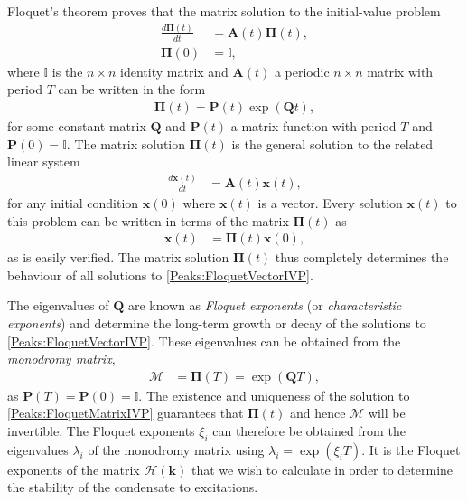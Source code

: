 Floquet's theorem proves that the matrix solution to the initial-value problem
\begin{subequations}
    \label{Peaks:FloquetMatrixIVP}
    \begin{align}
        \frac{d\bm{\Pi}(t)}{dt} &= \bm{A}(t) \bm{\Pi}(t),\\
        \bm{\Pi}(0) &= \mathbb{I},
    \end{align}
\end{subequations}
where $\mathbb{I}$ is the $n \times n$ identity matrix and $\bm{A}(t)$ a periodic $n \times n$ matrix with period $T$ can be written in the form
\begin{align}
    \bm{\Pi}(t) = \bm{P}(t) \exp(\bm{Q} t),
\end{align}
for some constant matrix $\bm{Q}$ and $\bm{P}(t)$ a matrix function with period $T$ and $\bm{P}(0) = \mathbb{I}$. The matrix solution $\bm{\Pi}(t)$ is the general solution to the related linear system
\begin{align}
    \frac{d\bm{x}(t)}{dt} &= \bm{A}(t) \bm{x}(t),
    \label{Peaks:FloquetVectorIVP}
\end{align}
for any initial condition $\bm{x}(0)$ where $\bm{x}(t)$ is a vector. Every solution $\bm{x}(t)$ to this problem can be written in terms of the matrix $\bm{\Pi}(t)$ as
\begin{align}
    \bm{x}(t) &= \bm{\Pi}(t) \bm{x}(0),
\end{align}
as is easily verified. The matrix solution $\bm{\Pi}(t)$ thus completely determines the behaviour of all solutions to \eqref{Peaks:FloquetVectorIVP}.

The eigenvalues of $\bm{Q}$ are known as \emph{Floquet exponents} (or \emph{characteristic exponents}) and determine the long-term growth or decay of the solutions to \eqref{Peaks:FloquetVectorIVP}. These eigenvalues can be obtained from the \emph{monodromy matrix},
\begin{align}
    \label{Peaks:MonodromyMatrix}
    \mathcal{M} &= \bm{\Pi}(T) = \exp(\bm{Q} T),
\end{align}
as $\bm{P}(T) = \bm{P}(0) = \mathbb{I}$. The existence and uniqueness of the solution to \eqref{Peaks:FloquetMatrixIVP} guarantees that $\bm{\Pi}(t)$ and hence $\mathcal{M}$ will be invertible. The Floquet exponents $\xi_i$ can therefore be obtained from the eigenvalues $\lambda_i$ of the monodromy matrix using $\lambda_i = \exp(\xi_i T)$. It is the Floquet exponents of the matrix $\mathcal{H}(\bm{k})$ that we wish to calculate in order to determine the stability of the condensate to excitations.

